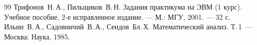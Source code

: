 \documentclass[a4paper,12pt,titlepage,finall]{article}
\begin{document}
\newpage
\begin{raggedright}
\begin{thebibliography}{99}
 Трифонов~Н.\,А., Пильщиков~В.\,Н. Задания практикума на ЭВМ (1 курс). Учебное пособие, 2-е исправленное издание. —
М.: МГУ, 2001. — 32 с. 
 Ильин~В.\,А., Садовничий~В.\,А., Сендов~Бл.\,Х. Математический анализ. Т.\,1~---
    Москва: Наука, 1985.
\end{thebibliography}
\end{raggedright}
\end{document}
